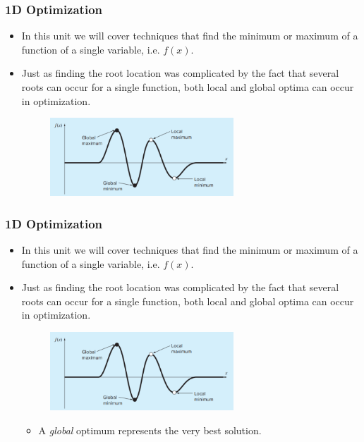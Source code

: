 \documentclass{if-beamer}
\begin{document}
\begin{frame}[t]
	\frametitle{1D Optimization}
	\begin{itemize}
		\item In this unit we will cover techniques that find the minimum or maximum of a function of a single variable, i.e. $f(x)$.
		\item Just as finding the root location was complicated by the fact that several roots can occur for a single function, both local
		and global optima can occur in optimization.
		\begin{figure}
			\centering
			\includegraphics[width = 0.65\textwidth]{figures/localglobal}
		\end{figure}
	\end{itemize}
\end{frame}

\begin{frame}[t]
	\frametitle{1D Optimization}
	\begin{itemize}
		\item In this unit we will cover techniques that find the minimum or maximum of a function of a single variable, i.e. $f(x)$.
		\item Just as finding the root location was complicated by the fact that several roots can occur for a single function, both local
		and global optima can occur in optimization.
		\begin{figure}
			\centering
			\includegraphics[width = 0.65\textwidth]{figures/localglobal}
		\end{figure}
		\begin{itemize}
			\item A \textit{global} optimum represents the very best solution. 
		\end{itemize}
	\end{itemize}
\end{frame}
\end{document}

